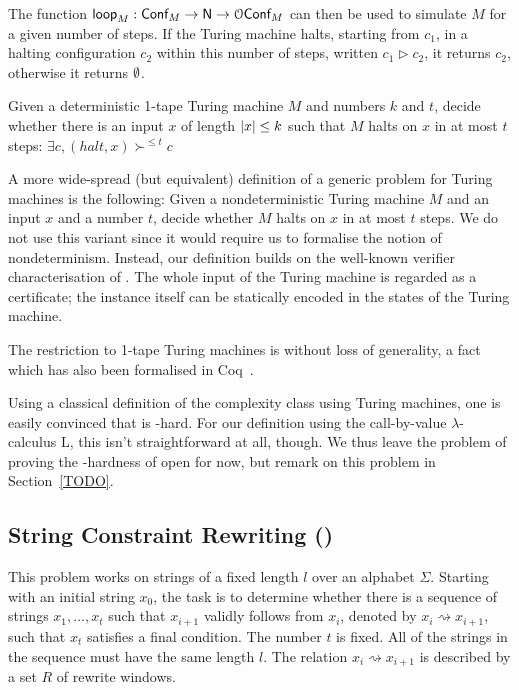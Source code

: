 \documentclass[a4paper,UKenglish,cleveref, autoref]{lipics-v2019}
\newcommand{\strent}{\rightsquigarrow}
\begin{document}
The function $\textsf{loop}_M : \textsf{Conf}_M \rightarrow \mathsf{N} \rightarrow \mathcal{O}{\textsf{Conf}_M}$ can then be used to simulate $M$ for a given number of steps. If the Turing machine halts, starting from $c_1$, in a halting configuration $c_2$ within this number of steps, written $c_1 \rhd c_2$, it returns $c_2$, otherwise it returns $\emptyset$.


\begin{definition}[\gennp{}]
  Given a deterministic 1-tape Turing machine $M$ and numbers $k$ and $t$, decide whether there is an input $x$ of length $|x| \le k$ such that $M$ halts on $x$ in at most $t$ steps: $ \exists c, (\mathit{halt}, x) \succ^{\le t} c $
\end{definition}

A more wide-spread (but equivalent) definition of a generic problem for Turing machines is the following: Given a nondeterministic Turing machine $M$ and an input $x$ and a number $t$, decide whether $M$ halts on $x$ in at most $t$ steps. 
We do not use this variant since it would require us to formalise the notion of nondeterminism. Instead, our definition builds on the well-known verifier characterisation of \NP{}. The whole input of the Turing machine is regarded as a certificate; the instance itself can be statically encoded in the states of the Turing machine.

The restriction to 1-tape Turing machines is without loss of generality, a fact which has also been formalised in Coq~\cite{ForsterEtAl:2019:VerifiedTMs}. 

Using a classical definition of the complexity class \NP{} using Turing machines, one is easily convinced that \gennp{} is \NP{}-hard. For our definition using the call-by-value $\lambda$-calculus L, this isn't straightforward at all, though. We thus leave the problem of proving the \NP{}-hardness of \gennp{} open for now, but remark on this problem in Section~\ref{TODO}.

\subsection*{String Constraint Rewriting (\strconrew{})}
This problem works on strings of a fixed length $l$ over an alphabet $\Sigma$. Starting with an initial string $x_0$, the task is to determine whether there is a sequence of strings $x_1, \ldots, x_t$ such that $x_{i+1}$ validly follows from $x_i$, denoted by $x_i \strent x_{i+1}$, such that $x_t$ satisfies a final condition. The number $t$ is fixed. All of the strings in the sequence must have the same length $l$. The relation $x_i \strent x_{i+1}$ is described by a set $R$ of rewrite windows.
\end{document}
